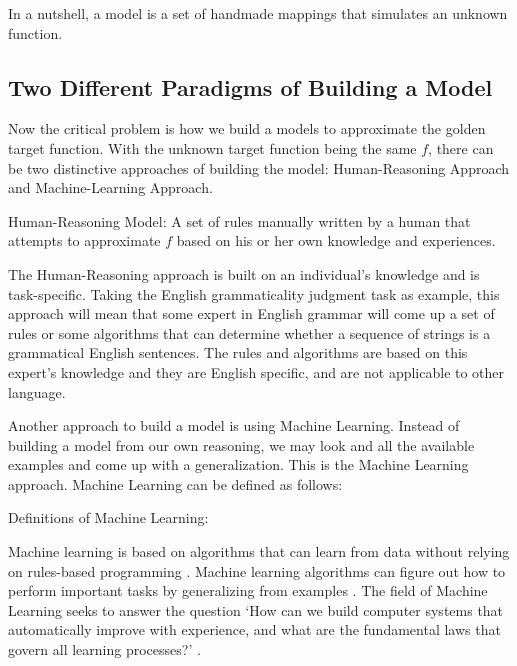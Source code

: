 \documentclass[final]{ua-thesis}
\numberwithin{equation}{section}
\begin{document}
In a nutshell, a model is a set of handmade mappings that simulates an unknown function. 

\subsection{Two Different Paradigms of Building a Model}

Now the critical problem is how we build a models to approximate the golden target function. With the unknown target function being the same $f$, there can be two distinctive approaches of building the model: Human-Reasoning Approach and Machine-Learning Approach. 

\begin{exe}
\ex Human-Reasoning Model:
A set of rules manually written by a human that attempts to approximate $f$ based on his or her own knowledge and experiences. 
\end{exe}

The Human-Reasoning approach is built on an individual's knowledge and is task-specific. 
Taking the English grammaticality judgment task as example, this approach will mean that some expert in English grammar will come up a set of rules or some algorithms that can determine whether a sequence of strings is a grammatical English sentences. 
The rules and algorithms are based on this expert's knowledge and they are English specific, and are not applicable to other language.     


Another approach to build a model is using Machine Learning. Instead of building a model from our own reasoning, we may look and all the available examples and come up with a generalization. This is the Machine Learning approach. 
Machine Learning can be defined as follows:

\begin{exe}
\ex Definitions of Machine Learning:
\begin{xlist}
	\ex Machine learning is based on algorithms that can learn from data without relying on rules-based programming \citep{pyle2015executive}. 
	\ex Machine learning algorithms can figure out how to perform important tasks by generalizing from examples \citep{domingos2012few}.
	\ex The field of Machine Learning seeks to answer the question `How can we build computer systems that automatically improve with experience, and what are the fundamental laws that govern all learning processes?' \citep{mitchell2006discipline}.
\end{xlist}
\end{exe}   
\end{document}
